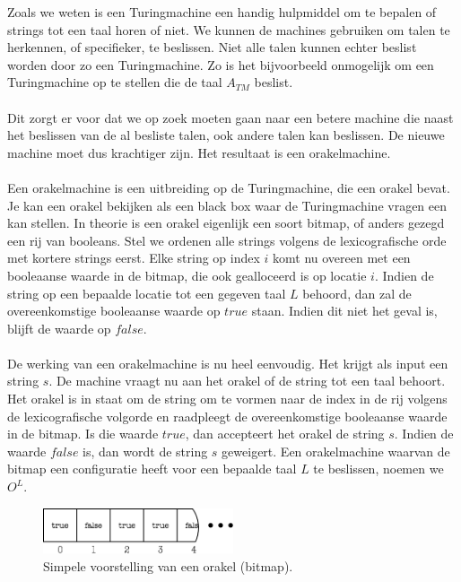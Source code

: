 Zoals we weten is een Turingmachine een handig hulpmiddel om te bepalen of strings tot een taal horen of niet. We kunnen de machines gebruiken om talen te herkennen, of specifieker, te beslissen. Niet alle talen kunnen echter beslist worden door zo een Turingmachine. Zo is het bijvoorbeeld onmogelijk om een Turingmachine op te stellen die de taal $A_{TM}$ beslist.
\\\\
Dit zorgt er voor dat we op zoek moeten gaan naar een betere machine die naast het beslissen van de al besliste talen, ook andere talen kan beslissen. De nieuwe machine moet dus krachtiger zijn. Het resultaat is een orakelmachine.
\\\\
Een orakelmachine is een uitbreiding op de Turingmachine, die een orakel bevat. Je kan een orakel bekijken als een black box waar de Turingmachine vragen een kan stellen. In theorie is een orakel eigenlijk een soort bitmap, of anders gezegd een rij van booleans. Stel we ordenen alle strings volgens de lexicografische orde met kortere strings eerst. Elke string op index $i$ komt nu overeen met een booleaanse waarde in de bitmap, die ook gealloceerd is op locatie $i$. Indien de string op een bepaalde locatie tot een gegeven taal $L$ behoord, dan zal de overeenkomstige booleaanse waarde op $true$ staan. Indien dit niet het geval is, blijft de waarde op $false$.
\\\\
De werking van een orakelmachine is nu heel eenvoudig. Het krijgt als input een string $s$. De machine vraagt nu aan het orakel of de string tot een taal behoort. Het orakel is in staat om de string om te vormen naar de index in de rij volgens de lexicografische volgorde en raadpleegt de overeenkomstige booleaanse waarde in de bitmap. Is die waarde $true$, dan accepteert het orakel de string $s$. Indien de waarde $false$ is, dan wordt de string $s$ geweigert. Een orakelmachine waarvan de bitmap een configuratie heeft voor een bepaalde taal $L$ te beslissen, noemen we $O^L$.

\vspace{3mm}
\begin{figure}[h!]
  \centering
      \includegraphics[width=0.5\textwidth]{./img/oracle}
  \caption{Simpele voorstelling van een orakel (bitmap).}
\end{figure}
\vspace{3mm}

